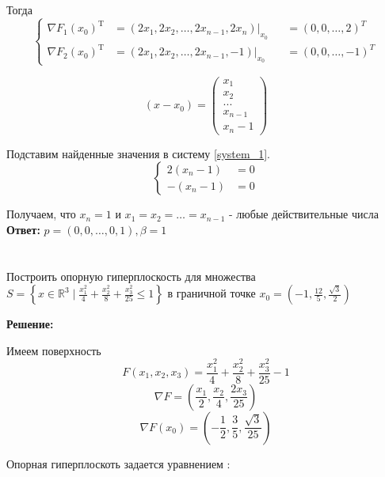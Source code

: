 \documentclass[a4paper,12pt]{article}
\newcommand{\lt}{\left}
\newcommand{\rt}{\right}
\begin{document}
Тогда
\[
\left\{
\begin{aligned}
\nabla F_1(x_0)	^ \mathrm{T} &= \lt(2x_1, 2x_2, \ldots, 2x_{n-1}, 2x_n\rt)\Big|_{x_0}&&= (0, 0, \ldots, 2)^T  \\
\nabla F_2(x_0)	^ \mathrm{T} &= (2x_1, 2x_2, \ldots, 2x_{n-1}, -1)\Big|_{x_0} &&= (0, 0, \ldots, -1)^T
\end{aligned}
\right.
\]

\[
(x-x_0) = \begin{pmatrix}
x_1 \\
x_2\\
...\\
x_{n-1}\\
x_n-1
\end{pmatrix}
\]

Подставим найденные значения в систему \ref{system_1}.
\begin{equation}
\left\{
\begin{aligned}
2(x_n -1 ) &= 0  \\
-(x_n - 1) &= 0
\end{aligned}
\right.
\end{equation}

Получаем, что $x_n = 1$ и $x_1= x_2  = \ldots = x_{n-1}$ - любые действительные числа\\

\textbf{Ответ:}
$p = (0, 0, \ldots, 0, 1), \beta = 1$\\




\section{}

Построить опорную гиперплоскость для множества $S = \left\{ x \in \mathbb{R}^3 \mid \frac{x_1^2}{4}+\frac{x_2^2}{8}+\frac{x_3^2}{25} \le 1 \right\}$ в граничной точке $x_0 = \lt(-1, \frac{12}{5}, \frac{\sqrt{3}}{2}\rt)$

\vspace{\baselineskip}

\textbf{Решение:}

\vspace{\baselineskip}


Имеем поверхность 
$$F(x_1,x_2,x_3)= \dfrac{x_1^2}{4} + \dfrac{x_2^2}{8} + \dfrac{x_3^2}{25} - 1$$
$$\nabla F = \lt(\frac{x_1}{2}, \frac{x_2}{4}, \frac{2x_3}{25}\rt)$$
$$\nabla F(x_0) = \lt(-\frac{1}{2}, \frac{3}{5}, \frac{\sqrt{3}}{25}\rt)$$

Опорная гиперплоскоть задается уравнением :
\end{document}
